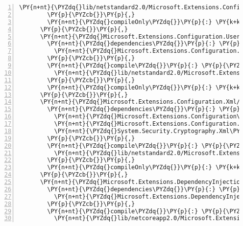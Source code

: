 \begin{Verbatim}[commandchars=\\\{\},numbers=left,firstnumber=1,stepnumber=1,numberblanklines=0]
          \PY{n+nt}{\PYZdq{}lib/netstandard2.0/Microsoft.Extensions.Configuration.KeyPerFile.dll\PYZdq{}}\PY{p}{:} \PY{p}{\PYZob{}}\PY{p}{\PYZcb{}}
        \PY{p}{\PYZcb{}}\PY{p}{,}
        \PY{n+nt}{\PYZdq{}compileOnly\PYZdq{}}\PY{p}{:} \PY{k+kc}{true}
      \PY{p}{\PYZcb{}}\PY{p}{,}
      \PY{n+nt}{\PYZdq{}Microsoft.Extensions.Configuration.UserSecrets/2.1.0\PYZhy{}rc1\PYZhy{}final\PYZdq{}}\PY{p}{:} \PY{p}{\PYZob{}}
        \PY{n+nt}{\PYZdq{}dependencies\PYZdq{}}\PY{p}{:} \PY{p}{\PYZob{}}
          \PY{n+nt}{\PYZdq{}Microsoft.Extensions.Configuration.Json\PYZdq{}}\PY{p}{:} \PY{l+s+s2}{\PYZdq{}2.1.0\PYZhy{}rc1\PYZhy{}final\PYZdq{}}
        \PY{p}{\PYZcb{}}\PY{p}{,}
        \PY{n+nt}{\PYZdq{}compile\PYZdq{}}\PY{p}{:} \PY{p}{\PYZob{}}
          \PY{n+nt}{\PYZdq{}lib/netstandard2.0/Microsoft.Extensions.Configuration.UserSecrets.dll\PYZdq{}}\PY{p}{:} \PY{p}{\PYZob{}}\PY{p}{\PYZcb{}}
        \PY{p}{\PYZcb{}}\PY{p}{,}
        \PY{n+nt}{\PYZdq{}compileOnly\PYZdq{}}\PY{p}{:} \PY{k+kc}{true}
      \PY{p}{\PYZcb{}}\PY{p}{,}
      \PY{n+nt}{\PYZdq{}Microsoft.Extensions.Configuration.Xml/2.1.0\PYZhy{}rc1\PYZhy{}final\PYZdq{}}\PY{p}{:} \PY{p}{\PYZob{}}
        \PY{n+nt}{\PYZdq{}dependencies\PYZdq{}}\PY{p}{:} \PY{p}{\PYZob{}}
          \PY{n+nt}{\PYZdq{}Microsoft.Extensions.Configuration\PYZdq{}}\PY{p}{:} \PY{l+s+s2}{\PYZdq{}2.1.0\PYZhy{}rc1\PYZhy{}final\PYZdq{}}\PY{p}{,}
          \PY{n+nt}{\PYZdq{}Microsoft.Extensions.Configuration.FileExtensions\PYZdq{}}\PY{p}{:} \PY{l+s+s2}{\PYZdq{}2.1.0\PYZhy{}rc1\PYZhy{}final\PYZdq{}}\PY{p}{,}
          \PY{n+nt}{\PYZdq{}System.Security.Cryptography.Xml\PYZdq{}}\PY{p}{:} \PY{l+s+s2}{\PYZdq{}4.5.0\PYZhy{}rc1\PYZdq{}}
        \PY{p}{\PYZcb{}}\PY{p}{,}
        \PY{n+nt}{\PYZdq{}compile\PYZdq{}}\PY{p}{:} \PY{p}{\PYZob{}}
          \PY{n+nt}{\PYZdq{}lib/netstandard2.0/Microsoft.Extensions.Configuration.Xml.dll\PYZdq{}}\PY{p}{:} \PY{p}{\PYZob{}}\PY{p}{\PYZcb{}}
        \PY{p}{\PYZcb{}}\PY{p}{,}
        \PY{n+nt}{\PYZdq{}compileOnly\PYZdq{}}\PY{p}{:} \PY{k+kc}{true}
      \PY{p}{\PYZcb{}}\PY{p}{,}
      \PY{n+nt}{\PYZdq{}Microsoft.Extensions.DependencyInjection/2.1.0\PYZhy{}rc1\PYZhy{}final\PYZdq{}}\PY{p}{:} \PY{p}{\PYZob{}}
        \PY{n+nt}{\PYZdq{}dependencies\PYZdq{}}\PY{p}{:} \PY{p}{\PYZob{}}
          \PY{n+nt}{\PYZdq{}Microsoft.Extensions.DependencyInjection.Abstractions\PYZdq{}}\PY{p}{:} \PY{l+s+s2}{\PYZdq{}2.1.0\PYZhy{}rc1\PYZhy{}final\PYZdq{}}
        \PY{p}{\PYZcb{}}\PY{p}{,}
        \PY{n+nt}{\PYZdq{}compile\PYZdq{}}\PY{p}{:} \PY{p}{\PYZob{}}
          \PY{n+nt}{\PYZdq{}lib/netcoreapp2.0/Microsoft.Extensions.DependencyInjection.dll\PYZdq{}}\PY{p}{:} \PY{p}{\PYZob{}}\PY{p}{\PYZcb{}}

\end{Verbatim}
